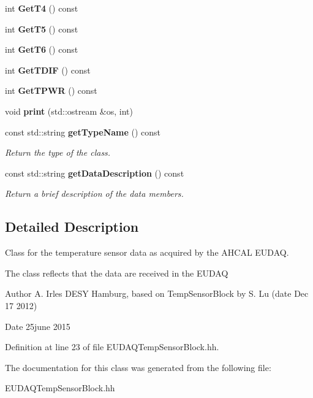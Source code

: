 \begin{DoxyCompactItemize}
\item 
int {\bfseries Get\-T4} () const \label{classCALICE_1_1EUDAQTempSensorBlock_a02a094c6b095e4aa1a813ba6027b039b}

\item 
int {\bfseries Get\-T5} () const \label{classCALICE_1_1EUDAQTempSensorBlock_a7dcee9102c3faddf788cb26584bd991f}

\item 
int {\bfseries Get\-T6} () const \label{classCALICE_1_1EUDAQTempSensorBlock_a8dc023707cd85d0617ac89f9ccd04f91}

\item 
int {\bfseries Get\-T\-D\-I\-F} () const \label{classCALICE_1_1EUDAQTempSensorBlock_a84eecef47e27057ca1a52c2a771f65ec}

\item 
int {\bfseries Get\-T\-P\-W\-R} () const \label{classCALICE_1_1EUDAQTempSensorBlock_a5f8f3e5ed6e1dafbd2bd2e5a6c571ded}

\item 
void {\bfseries print} (std\-::ostream \&os, int)\label{classCALICE_1_1EUDAQTempSensorBlock_a573889f528e77c39321d3042d8715301}

\item 
const std\-::string {\bf get\-Type\-Name} () const \label{classCALICE_1_1EUDAQTempSensorBlock_aaf80776bd59b87c45ef15e10316142c4}

\begin{DoxyCompactList}\small\item\em Return the type of the class. \end{DoxyCompactList}\item 
const std\-::string {\bf get\-Data\-Description} () const \label{classCALICE_1_1EUDAQTempSensorBlock_a63392b2373970e5d7d4854f5027a96ec}

\begin{DoxyCompactList}\small\item\em Return a brief description of the data members. \end{DoxyCompactList}\end{DoxyCompactItemize}


\subsection{Detailed Description}
Class for the temperature sensor data as acquired by the A\-H\-C\-A\-L E\-U\-D\-A\-Q. 

The class reflects that the data are received in the E\-U\-D\-A\-Q \begin{DoxyAuthor}{Author}
A. Irles D\-E\-S\-Y Hamburg, based on Temp\-Sensor\-Block by S. Lu (date Dec 17 2012) 
\end{DoxyAuthor}
\begin{DoxyDate}{Date}
25june 2015 
\end{DoxyDate}


Definition at line 23 of file E\-U\-D\-A\-Q\-Temp\-Sensor\-Block.\-hh.



The documentation for this class was generated from the following file\-:\begin{DoxyCompactItemize}
\item 
E\-U\-D\-A\-Q\-Temp\-Sensor\-Block.\-hh\end{DoxyCompactItemize}
